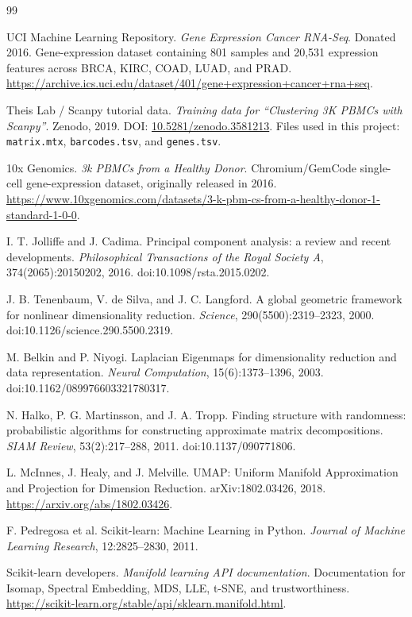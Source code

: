 \documentclass[10pt]{article}
\begin{document}
\small
\begin{thebibliography}{99}

UCI Machine Learning Repository.
\newblock \emph{Gene Expression Cancer RNA-Seq}.
\newblock Donated 2016. Gene-expression dataset containing 801 samples and
20,531 expression features across BRCA, KIRC, COAD, LUAD, and PRAD.
\newblock
\url{https://archive.ics.uci.edu/dataset/401/gene+expression+cancer+rna+seq}.

Theis Lab / Scanpy tutorial data.
\newblock \emph{Training data for ``Clustering 3K PBMCs with Scanpy''}.
\newblock Zenodo, 2019. DOI:
\href{https://doi.org/10.5281/zenodo.3581213}{10.5281/zenodo.3581213}.
\newblock Files used in this project:
\texttt{matrix.mtx}, \texttt{barcodes.tsv}, and \texttt{genes.tsv}.

10x Genomics.
\newblock \emph{3k PBMCs from a Healthy Donor}.
\newblock Chromium/GemCode single-cell gene-expression dataset, originally
released in 2016.
\newblock
\url{https://www.10xgenomics.com/datasets/3-k-pbm-cs-from-a-healthy-donor-1-standard-1-0-0}.

I. T. Jolliffe and J. Cadima.
\newblock Principal component analysis: a review and recent developments.
\newblock \emph{Philosophical Transactions of the Royal Society A},
374(2065):20150202, 2016.
\newblock doi:10.1098/rsta.2015.0202.

J. B. Tenenbaum, V. de Silva, and J. C. Langford.
\newblock A global geometric framework for nonlinear dimensionality reduction.
\newblock \emph{Science}, 290(5500):2319--2323, 2000.
\newblock doi:10.1126/science.290.5500.2319.

M. Belkin and P. Niyogi.
\newblock Laplacian Eigenmaps for dimensionality reduction and data
representation.
\newblock \emph{Neural Computation}, 15(6):1373--1396, 2003.
\newblock doi:10.1162/089976603321780317.

N. Halko, P. G. Martinsson, and J. A. Tropp.
\newblock Finding structure with randomness: probabilistic algorithms for
constructing approximate matrix decompositions.
\newblock \emph{SIAM Review}, 53(2):217--288, 2011.
\newblock doi:10.1137/090771806.

L. McInnes, J. Healy, and J. Melville.
\newblock UMAP: Uniform Manifold Approximation and Projection for Dimension
Reduction.
\newblock arXiv:1802.03426, 2018.
\newblock \url{https://arxiv.org/abs/1802.03426}.

F. Pedregosa et al.
\newblock Scikit-learn: Machine Learning in Python.
\newblock \emph{Journal of Machine Learning Research},
12:2825--2830, 2011.

Scikit-learn developers.
\newblock \emph{Manifold learning API documentation}.
\newblock Documentation for Isomap, Spectral Embedding, MDS, LLE, t-SNE, and
trustworthiness.
\newblock \url{https://scikit-learn.org/stable/api/sklearn.manifold.html}.

\end{thebibliography}
\end{document}
